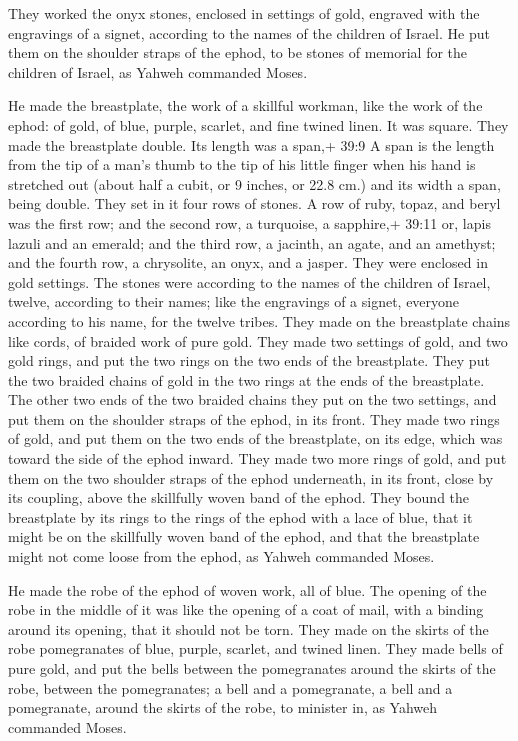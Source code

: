  They worked the onyx stones, enclosed in settings of gold,
engraved with the engravings of a signet, according to the names of the
children of Israel.  He put them on the shoulder straps of
the ephod, to be stones of memorial for the children of Israel, as
Yahweh commanded Moses.

 He made the breastplate, the work of a skillful workman,
like the work of the ephod: of gold, of blue, purple, scarlet, and fine
twined linen.  It was square. They made the breastplate
double. Its length was a span,+ 39:9 A span is the length from the tip
of a man's thumb to the tip of his little finger when his hand is
stretched out (about half a cubit, or 9 inches, or 22.8 cm.) and its
width a span, being double.  They set in it four rows of
stones. A row of ruby, topaz, and beryl was the first row; 
and the second row, a turquoise, a sapphire,+ 39:11 or, lapis lazuli and
an emerald;  and the third row, a jacinth, an agate, and an
amethyst;  and the fourth row, a chrysolite, an onyx, and a
jasper. They were enclosed in gold settings.  The stones
were according to the names of the children of Israel, twelve, according
to their names; like the engravings of a signet, everyone according to
his name, for the twelve tribes.  They made on the
breastplate chains like cords, of braided work of pure gold.
 They made two settings of gold, and two gold rings, and
put the two rings on the two ends of the breastplate.  They
put the two braided chains of gold in the two rings at the ends of the
breastplate.  The other two ends of the two braided chains
they put on the two settings, and put them on the shoulder straps of the
ephod, in its front.  They made two rings of gold, and put
them on the two ends of the breastplate, on its edge, which was toward
the side of the ephod inward.  They made two more rings of
gold, and put them on the two shoulder straps of the ephod underneath,
in its front, close by its coupling, above the skillfully woven band of
the ephod.  They bound the breastplate by its rings to the
rings of the ephod with a lace of blue, that it might be on the
skillfully woven band of the ephod, and that the breastplate might not
come loose from the ephod, as Yahweh commanded Moses.

 He made the robe of the ephod of woven work, all of blue.
 The opening of the robe in the middle of it was like the
opening of a coat of mail, with a binding around its opening, that it
should not be torn.  They made on the skirts of the robe
pomegranates of blue, purple, scarlet, and twined linen. 
They made bells of pure gold, and put the bells between the pomegranates
around the skirts of the robe, between the pomegranates;  a
bell and a pomegranate, a bell and a pomegranate, around the skirts of
the robe, to minister in, as Yahweh commanded Moses.

